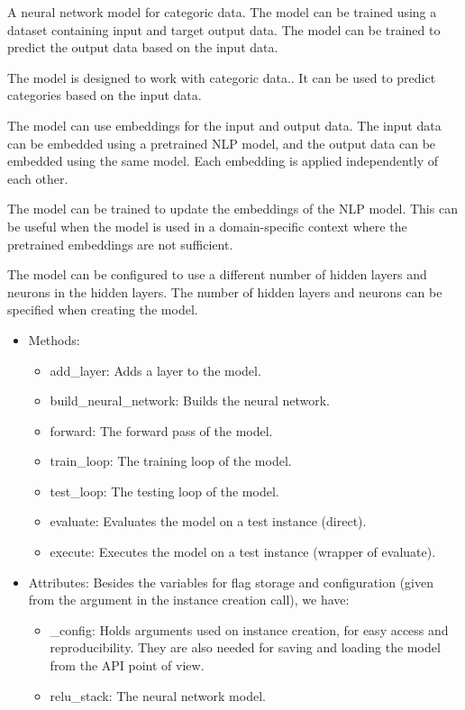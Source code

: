 \documentclass[a4paper, 11pt]{report}
\begin{document}
   \begin{tcolorbox}[title=CategoricNeuralNetwork - From the docs]
    A neural network model for categoric data. The model can be trained using a dataset containing input and target output data. The model
    can be trained to predict the output data based on the input data.

    The model is designed to work with categoric data..
    It can be used to predict categories based on the input data.

    The model can use embeddings for the input and output data. The input data can be
    embedded using a pretrained NLP model, and the output data can be embedded using
    the same model. Each embedding is applied independently of each other.

    The model can be trained to update the embeddings of the NLP model. This can be
    useful when the model is used in a domain-specific context where the pretrained
    embeddings are not sufficient.

    The model can be configured to use a different number of hidden layers and neurons
    in the hidden layers. The number of hidden layers and neurons can be specified when
    creating the model.

    \begin{itemize}
    \item Methods:
        \begin{itemize}
            \item add\_layer: Adds a layer to the model.
            \item build\_neural\_network: Builds the neural network.
            \item forward: The forward pass of the model.
            \item train\_loop: The training loop of the model.
            \item test\_loop: The testing loop of the model.
            \item evaluate: Evaluates the model on a test instance (direct).
            \item execute: Executes the model on a test instance (wrapper of evaluate).
        \end{itemize}

    \item Attributes:
    Besides the variables for flag storage and configuration (given from the argument in the instance creation call), we have:
        \begin{itemize}
            \item \_config: Holds arguments used on instance creation, for easy access and reproducibility. They are also needed for  saving and loading the model from the API point of view.
            \item relu\_stack: The neural network model.
        \end{itemize}
    \end{itemize}
   \end{tcolorbox}
\end{document}
